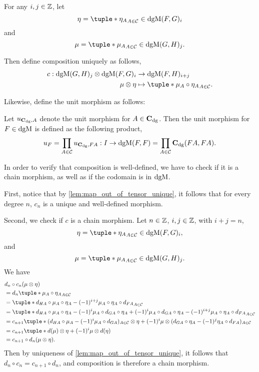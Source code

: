\begin{remark}
    \label{rem:dgm_composition_and_unit_morphisms}
    For any \( i, j \in {\mathbb{Z}} \), let
    \[
        \eta = \tuple*{\eta_A}_{A \in \Cc} \in \dgM(F, G)_i
    \]
    and
    \[
        \mu = \tuple*{\mu_A}_{A \in \Cc} \in \dgM(G, H)_j.
    \]

    Then define composition uniquely as follows,
    \begin{align*}
        c: \dgM(G, H)_j \otimes \dgM(F, G)_i &\to \dgM(F, H)_{i + j} \\
        \mu \otimes \eta &\mapsto \tuple*{\mu_A \circ \eta_A}_{A \in \Cc}.
    \end{align*}

    Likewise, define the unit morphism as follows:
    
    Let \( u_{\operatorname{\mathbf{C}}_{\operatorname{dg}}, A} \) denote the unit morphism for \( A \in \operatorname{\mathbf{C}}_{\operatorname{dg}} \). Then the unit morphism for \( F \in \operatorname{dgM} \) is defined as the following product,
    \[
        u_F = \prod_{A \in {\mathcal{C}}} u_{\operatorname{\mathbf{C}}_{\operatorname{dg}}, F A} : I \to \operatorname{dgM}(F, F) = \prod_{A \in {\mathcal{C}}} \operatorname{\mathbf{C}}_{\operatorname{dg}}(F A, F A).
    \]

    In order to verify that composition is well-defined, we have to check if it is a chain morphism, as well as if the codomain is in \( \operatorname{dgM} \).

    First, notice that by \autoref{lem:map_out_of_tensor_unique}, it follows that for every degree \( n \), \( c_n \) is a unique and well-defined morphism.

    Second, we check if \( c \) is a chain morphism. Let \( n \in {\mathbb{Z}} \), \( i, j \in {\mathbb{Z}} \), with \( i + j = n \),
    \[
        \eta = \tuple*{\eta_A}_{A \in \Cc} \in \dgM(F, G)_i,
    \]
    and
    \[
        \mu = \tuple*{\mu_A}_{A \in \Cc} \in \dgM(G, H)_j.
    \]
    We have
    \begin{align*}
        &d_n \circ c_n (\mu \otimes \eta) \\
        &= d_n \tuple*{\mu_A \circ \eta_A}_{A \in \Cc} \\
        &= \tuple*{d_{H A} \circ \mu_A \circ \eta_A - (-1)^{i + j} \mu_A \circ \eta_A \circ d_{F A}}_{A \in \Cc} \\
        &= \tuple*{d_{H A} \circ \mu_A \circ \eta_A - (-1)^i \mu_A \circ d_{G A} \circ \eta_A + (-1)^i \mu_A \circ d_{G A} \circ \eta_A - (-1)^{i + j} \mu_A \circ \eta_A \circ d_{F A}}_{A \in \Cc} \\
        &= c_{n + 1} \tuple*{ (d_{H A} \circ \mu_A - (-1)^i \mu_A \circ d_{G A})_{A \in \Cc} \otimes \eta + (-1)^i \mu \otimes (d_{G A} \circ \eta_A - (-1)^j \eta_A \circ d_{F A})_{A \in \Cc} } \\
        &= c_{n + 1} \tuple*{ d(\mu) \otimes \eta + (-1)^i \mu \otimes d(\eta) } \\
        &= c_{n + 1} \circ d_n (\mu \otimes \eta).
    \end{align*}
    Then by uniqueness of \autoref{lem:map_out_of_tensor_unique}, it follows that \( d_n \circ c_n = c_{n + 1} \circ d_n \), and composition is therefore a chain morphism.
    

\end{remark}
